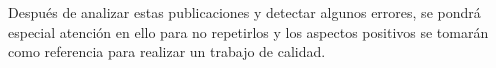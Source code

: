 Después de analizar estas publicaciones y detectar algunos errores, se pondrá especial atención en ello para no repetirlos y los aspectos positivos se tomarán como referencia para realizar un trabajo de calidad.

